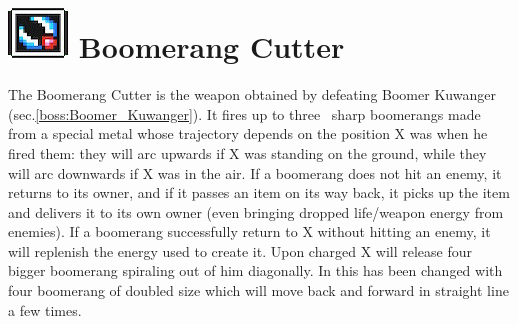 \section{\includegraphics[scale=0.2]{figures/X1/weapons/B_cutter.jpg} Boomerang Cutter}\label{Boomerang_cutter}
The Boomerang Cutter is the weapon obtained by defeating Boomer Kuwanger (sec.\ref{boss:Boomer_Kuwanger}). It fires up to three~\cite{wiki:Boomerang_cutter} sharp boomerangs made from a special metal whose trajectory depends on the position X was when he fired them: they will arc upwards if X was standing on the ground, while they will arc downwards if X was in the air. If a boomerang does not hit an enemy, it returns to its owner, and if it passes an item on its way back, it picks up the item and delivers it to its own owner (even bringing dropped life/weapon energy from enemies). If a boomerang successfully return to X without hitting an enemy, it will replenish the energy used to create it. Upon charged X will release four bigger boomerang spiraling out of him diagonally. In \mhx this has been changed with four boomerang of doubled size which will move back and forward in straight line a few times. 


